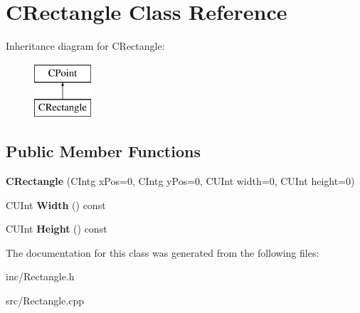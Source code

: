 \hypertarget{classCRectangle}{\section{C\-Rectangle Class Reference}
\label{classCRectangle}
}
Inheritance diagram for C\-Rectangle\-:\begin{figure}[H]
\begin{center}
\leavevmode
\includegraphics[height=2.000000cm]{classCRectangle}
\end{center}
\end{figure}
\subsection*{Public Member Functions}
\begin{DoxyCompactItemize}
\item 
\hypertarget{classCRectangle_aa0d285f137acc223be0bd1b0565d65ed}{{\bfseries C\-Rectangle} (C\-Intg x\-Pos=0, C\-Intg y\-Pos=0, C\-U\-Int width=0, C\-U\-Int height=0)}\label{classCRectangle_aa0d285f137acc223be0bd1b0565d65ed}

\item 
\hypertarget{classCRectangle_adc9c9c8d242dfcefb2016753e3b6f276}{C\-U\-Int {\bfseries Width} () const }\label{classCRectangle_adc9c9c8d242dfcefb2016753e3b6f276}

\item 
\hypertarget{classCRectangle_a7a94550650aa42f37595ab7120567c4a}{C\-U\-Int {\bfseries Height} () const }\label{classCRectangle_a7a94550650aa42f37595ab7120567c4a}

\end{DoxyCompactItemize}


The documentation for this class was generated from the following files\-:\begin{DoxyCompactItemize}
\item 
inc/Rectangle.\-h\item 
src/Rectangle.\-cpp\end{DoxyCompactItemize}
